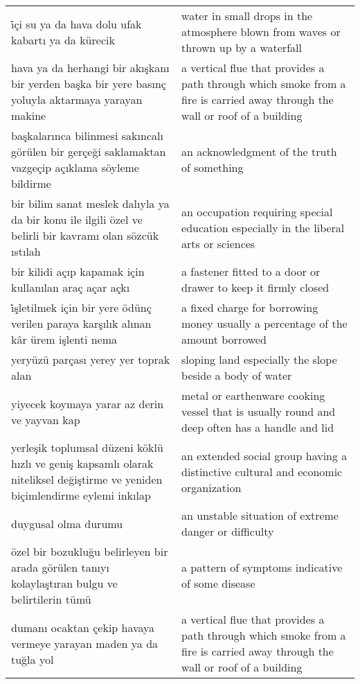 \begin{longtable}{p{} p{}}
    \cmidrule(rl){1-2}
    i̇çi su ya da hava dolu ufak kabartı ya da kürecik & water in small drops in the atmosphere blown from waves or thrown up by a waterfall \\
    \cmidrule(rl){1-2}
    hava ya da herhangi bir akışkanı bir yerden başka bir yere basınç yoluyla aktarmaya yarayan makine & a vertical flue that provides a path through which smoke from a fire is carried away through the wall or roof of a building \\
    \cmidrule(rl){1-2}
    başkalarınca bilinmesi sakıncalı görülen bir gerçeği saklamaktan vazgeçip açıklama söyleme bildirme & an acknowledgment of the truth of something \\
    \cmidrule(rl){1-2}
    bir bilim sanat meslek dalıyla ya da bir konu ile ilgili özel ve belirli bir kavramı olan sözcük ıstılah & an occupation requiring special education especially in the liberal arts or sciences \\
    \cmidrule(rl){1-2}
    bir kilidi açıp kapamak için kullanılan araç açar açkı & a fastener fitted to a door or drawer to keep it firmly closed \\
    \cmidrule(rl){1-2}
    i̇şletilmek için bir yere ödünç verilen paraya karşılık alınan kâr ürem işlenti nema & a fixed charge for borrowing money usually a percentage of the amount borrowed \\
    \cmidrule(rl){1-2}
    yeryüzü parçası yerey yer toprak alan & sloping land especially the slope beside a body of water \\
    \cmidrule(rl){1-2}
    yiyecek koymaya yarar az derin ve yayvan kap & metal or earthenware cooking vessel that is usually round and deep often has a handle and lid \\
    \cmidrule(rl){1-2}
    yerleşik toplumsal düzeni köklü hızlı ve geniş kapsamlı olarak niteliksel değiştirme ve yeniden biçimlendirme eylemi inkılap & an extended social group having a distinctive cultural and economic organization \\
    \cmidrule(rl){1-2}
    duygusal olma durumu & an unstable situation of extreme danger or difficulty \\
    \cmidrule(rl){1-2}
    özel bir bozukluğu belirleyen bir arada görülen tanıyı kolaylaştıran bulgu ve  belirtilerin tümü & a pattern of symptoms indicative of some disease \\
    \cmidrule(rl){1-2}
    dumanı ocaktan çekip havaya vermeye yarayan maden ya da tuğla yol & a vertical flue that provides a path through which smoke from a fire is carried away through the wall or roof of a building \\

\end{longtable}
